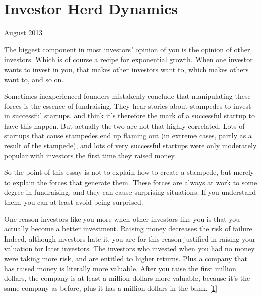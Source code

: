 \chapter{Investor Herd Dynamics}


            
              
                


                  
                    August 2013

The biggest component in most
                    investors' opinion of you is the opinion of other investors.
                    Which is of course a recipe for exponential growth. When one
                    investor wants to invest in you, that makes other investors
                    want to, which makes others want to, and so on.

Sometimes
                    inexperienced founders mistakenly conclude that manipulating
                    these forces is the essence of fundraising. They hear
                    stories about stampedes to invest in successful startups,
                    and think it's therefore the mark of a successful startup to
                    have this happen. But actually the two are not that highly
                    correlated. Lots of startups that cause stampedes end up
                    flaming out (in extreme cases, partly as a result of the
                    stampede), and lots of very successful startups were only
                    moderately popular with investors the first time they raised
                    money.

So the point of this essay is not to
                    explain how to create a stampede, but merely to explain the
                    forces that generate them. These forces are always at work
                    to some degree in fundraising, and they can cause surprising
                    situations. If you understand them, you can at least avoid
                    being surprised.

One reason investors like you
                    more when other investors like you is that you actually
                    become a better investment. Raising money decreases the risk
                    of failure. Indeed, although investors hate it, you are for
                    this reason justified in raising your valuation for later
                    investors. The investors who invested when you had no money
                    were taking more risk, and are entitled to higher returns.
                    Plus a company that has raised money is literally more
                    valuable. After you raise the first million dollars, the
                    company is at least a million dollars more valuable, because
                    it's the same company as before, plus it has a million
                    dollars in the bank.
                    [\href{\#f1n}{1}]

